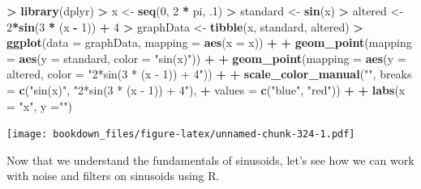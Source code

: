 \documentclass[]{krantz}
\makeatletter
\newenvironment{Shaded}{\begin{snugshade}}{\end{snugshade}}
\newcommand{\KeywordTok}[1]{\textcolor[rgb]{0.27,0.27,0.27}{\textbf{#1}}}
\newcommand{\DataTypeTok}[1]{\textcolor[rgb]{0.27,0.27,0.27}{#1}}
\newcommand{\DecValTok}[1]{\textcolor[rgb]{0.06,0.06,0.06}{#1}}
\newcommand{\StringTok}[1]{\textcolor[rgb]{0.5,0.5,0.5}{#1}}
\newcommand{\OperatorTok}[1]{\textcolor[rgb]{0.43,0.43,0.43}{\textbf{#1}}}
\newcommand{\NormalTok}[1]{#1}
\newenvironment{kframe}{%
\medskip{}
\setlength{\fboxsep}{.8em}
 \def\at@end@of@kframe{}%
 \ifinner\ifhmode%
  \def\at@end@of@kframe{\end{minipage}}%
  \begin{minipage}{\columnwidth}%
 \fi\fi%
 \def\FrameCommand##1{\hskip\@totalleftmargin \hskip-\fboxsep
 \colorbox{shadecolor}{##1}\hskip-\fboxsep
     \hskip-\linewidth \hskip-\@totalleftmargin \hskip\columnwidth}%
 \MakeFramed {\advance\hsize-\width
   \@totalleftmargin\z@ \linewidth\hsize
   \@setminipage}}%
 {\par\unskip\endMakeFramed%
 \at@end@of@kframe}
\renewenvironment{Shaded}{\begin{kframe}}{\end{kframe}}
\makeatother
\begin{document}
\begin{Shaded}
\begin{Highlighting}[]
\OperatorTok{>}\StringTok{ }\KeywordTok{library}\NormalTok{(dplyr)}
\OperatorTok{>}\StringTok{ }\NormalTok{x <-}\StringTok{ }\KeywordTok{seq}\NormalTok{(}\DecValTok{0}\NormalTok{, }\DecValTok{2} \OperatorTok{*}\StringTok{ }\NormalTok{pi, .}\DecValTok{1}\NormalTok{)}
\OperatorTok{>}\StringTok{ }\NormalTok{standard <-}\StringTok{ }\KeywordTok{sin}\NormalTok{(x)}
\OperatorTok{>}\StringTok{ }\NormalTok{altered <-}\StringTok{ }\DecValTok{2}\OperatorTok{*}\KeywordTok{sin}\NormalTok{(}\DecValTok{3} \OperatorTok{*}\StringTok{ }\NormalTok{(x }\OperatorTok{-}\StringTok{ }\DecValTok{1}\NormalTok{)) }\OperatorTok{+}\StringTok{ }\DecValTok{4}
\OperatorTok{>}\StringTok{ }\NormalTok{graphData <-}\StringTok{ }\KeywordTok{tibble}\NormalTok{(x, standard, altered)}
\OperatorTok{>}\StringTok{ }\KeywordTok{ggplot}\NormalTok{(}\DataTypeTok{data =}\NormalTok{ graphData, }\DataTypeTok{mapping =} \KeywordTok{aes}\NormalTok{(}\DataTypeTok{x =}\NormalTok{ x)) }\OperatorTok{+}\StringTok{ }
\OperatorTok{+}\StringTok{   }\KeywordTok{geom_point}\NormalTok{(}\DataTypeTok{mapping =} \KeywordTok{aes}\NormalTok{(}\DataTypeTok{y =}\NormalTok{ standard, }\DataTypeTok{color =} \StringTok{"sin(x)"}\NormalTok{)) }\OperatorTok{+}\StringTok{ }
\OperatorTok{+}\StringTok{   }\KeywordTok{geom_point}\NormalTok{(}\DataTypeTok{mapping =} \KeywordTok{aes}\NormalTok{(}\DataTypeTok{y =}\NormalTok{ altered, }\DataTypeTok{color =} \StringTok{"2*sin(3 * (x - 1)) + 4"}\NormalTok{)) }\OperatorTok{+}\StringTok{ }
\OperatorTok{+}\StringTok{   }\KeywordTok{scale_color_manual}\NormalTok{(}\StringTok{""}\NormalTok{, }\DataTypeTok{breaks =} \KeywordTok{c}\NormalTok{(}\StringTok{"sin(x)"}\NormalTok{, }\StringTok{"2*sin(3 * (x - 1)) + 4"}\NormalTok{), }
\OperatorTok{+}\StringTok{                      }\DataTypeTok{values =} \KeywordTok{c}\NormalTok{(}\StringTok{"blue"}\NormalTok{, }\StringTok{"red"}\NormalTok{)) }\OperatorTok{+}\StringTok{ }
\OperatorTok{+}\StringTok{   }\KeywordTok{labs}\NormalTok{(}\DataTypeTok{x =} \StringTok{"x"}\NormalTok{, }\DataTypeTok{y =}\StringTok{""}\NormalTok{)}
\end{Highlighting}
\end{Shaded}

\texttt{[image: bookdown\_files/figure-latex/unnamed-chunk-324-1.pdf]}

Now that we understand the fundamentals of sinusoids, let's see how we
can work with noise and filters on sinusoids using R.
\end{document}
